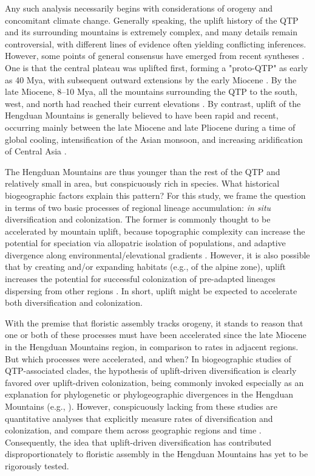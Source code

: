 Any such analysis necessarily begins with considerations of orogeny and concomitant climate change. Generally speaking, the uplift history of the QTP and its surrounding mountains is extremely complex, and many details remain controversial, with different lines of evidence often yielding conflicting inferences. However, some points of general consensus have emerged from recent syntheses \citep{Wang2014,Favre2015,Deng2015}. One is that the central plateau was uplifted first, forming a "proto-QTP" as early as 40 Mya, with subsequent outward extensions by the early Miocene \citep{Rowley2006,Wang2014}. By the late Miocene, 8--10 Mya, all the mountains surrounding the QTP to the south, west, and north had reached their current elevations \citep{Fang2005,WangE2012,Deng2015}. By contrast, uplift of the Hengduan Mountains is generally believed to have been rapid and recent, occurring mainly between the late Miocene and late Pliocene \citep{WangE2012,Wang2014,Meng2016,SunB2011} during a time of global cooling, intensification of the Asian monsoon, and increasing aridification of Central Asia \citep{Favre2015}.

The Hengduan Mountains are thus younger than the rest of the QTP and relatively small in area, but conspicuously rich in species. What historical biogeographic factors explain this pattern? For this study, we frame the question in terms of two basic processes of regional lineage accumulation: \textit{in situ} diversification and colonization. The former is commonly thought to be accelerated by mountain uplift, because topographic complexity can increase the potential for speciation via allopatric isolation of populations, and adaptive divergence along environmental/elevational gradients \citep{Hughes2006,LiuJ2006,Xu2010,Hoorn2013,Hughes2015}. However, it is also possible that by creating and/or expanding habitats (e.g., of the alpine zone), uplift increases the potential for successful colonization of pre-adapted lineages dispersing from other regions \citep{Zhou2013}. In short, uplift might be expected to accelerate both diversification and colonization.

With the premise that floristic assembly tracks orogeny, it stands to reason that one or both of these processes must have been accelerated since the late Miocene in the Hengduan Mountains region, in comparison to rates in adjacent regions. But which processes were accelerated, and when? In biogeographic studies of QTP-associated clades, the hypothesis of uplift-driven diversification is clearly favored over uplift-driven colonization, being commonly invoked especially as an explanation for phylogenetic or phylogeographic divergences in the Hengduan Mountains (e.g., \citealt{LiuJ2006,WangY2009,ZhangJ2014}). However, conspicuously lacking from these studies are quantitative analyses that explicitly measure rates of diversification and colonization, and compare them across geographic regions and time \citep{Wen2014,Favre2015}. Consequently, the idea that uplift-driven diversification has contributed disproportionately to floristic assembly in the Hengduan Mountains has yet to be rigorously tested.

